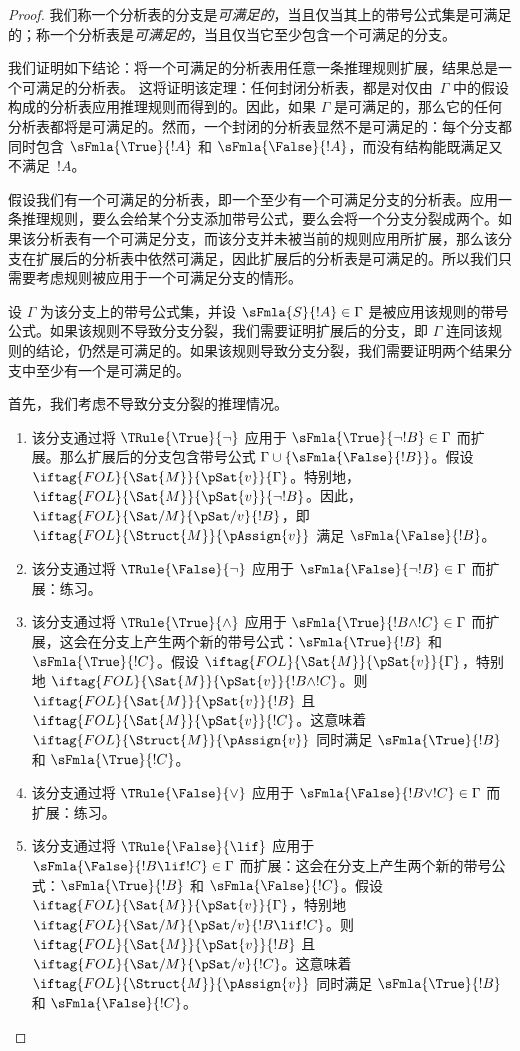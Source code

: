 \documentclass[../../../include/open-logic-section]{subfiles}
\begin{document}
\begin{proof}
我们称一个分析表的分支是\emph{可满足的}，当且仅当其上的带号公式集是可满足的；称一个分析表是\emph{可满足的}，当且仅当它至少包含一个可满足的分支。

我们证明如下结论：将一个可满足的分析表用任意一条推理规则扩展，结果总是一个可满足的分析表。
这将证明该定理：任何封闭分析表，都是对仅由~$\Gamma$ 中的假设构成的分析表应用推理规则而得到的。因此，如果 $\Gamma$ 是可满足的，那么它的任何分析表都将是可满足的。然而，一个封闭的分析表显然不是可满足的：每个分支都同时包含 $\sFmla{\True}{!A}$ 和 $\sFmla{\False}{!A}$，而没有结构能既满足又不满足~$!A$。

假设我们有一个可满足的分析表，即一个至少有一个可满足分支的分析表。应用一条推理规则，要么会给某个分支添加带号公式，要么会将一个分支分裂成两个。如果该分析表有一个可满足分支，而该分支并未被当前的规则应用所扩展，那么该分支在扩展后的分析表中依然可满足，因此扩展后的分析表是可满足的。所以我们只需要考虑规则被应用于一个可满足分支的情形。

设 $\Gamma$ 为该分支上的带号公式集，并设 $\sFmla{S}{!A} \in \Gamma$ 是被应用该规则的带号公式。如果该规则不导致分支分裂，我们需要证明扩展后的分支，即 $\Gamma$ 连同该规则的结论，仍然是可满足的。如果该规则导致分支分裂，我们需要证明两个结果分支中至少有一个是可满足的。

首先，我们考虑不导致分支分裂的推理情况。
\begin{enumerate}
\item 该分支通过将 $\TRule{\True}{\lnot}$ 应用于 $\sFmla{\True}{\lnot !B} \in \Gamma$ 而扩展。那么扩展后的分支包含带号公式 $\Gamma \cup
  \{\sFmla{\False}{!B}\}$。假设 $\iftag{FOL}{\Sat{M}}{\pSat{v}}{\Gamma}$。特别地，$\iftag{FOL}{\Sat{M}}{\pSat{v}}{\lnot !B}$。因此，$\iftag{FOL}{\Sat/{M}}{\pSat/{v}}{!B}$，即 $\iftag{FOL}{\Struct{M}}{\pAssign{v}}$ 满足 $\sFmla{\False}{!B}$。
\item 该分支通过将 $\TRule{\False}{\lnot}$ 应用于 $\sFmla{\False}{\lnot !B} \in \Gamma$ 而扩展：练习。
\item 该分支通过将 $\TRule{\True}{\land}$ 应用于 $\sFmla{\True}{!B \land !C} \in \Gamma$ 而扩展，这会在分支上产生两个新的带号公式：$\sFmla{\True}{!B}$ 和 $\sFmla{\True}{!C}$。假设 $\iftag{FOL}{\Sat{M}}{\pSat{v}}{\Gamma}$，特别地 $\iftag{FOL}{\Sat{M}}{\pSat{v}}{!B \land !C}$。则 $\iftag{FOL}{\Sat{M}}{\pSat{v}}{!B}$ 且 $\iftag{FOL}{\Sat{M}}{\pSat{v}}{!C}$。这意味着 $\iftag{FOL}{\Struct{M}}{\pAssign{v}}$ 同时满足 $\sFmla{\True}{!B}$ 和 $\sFmla{\True}{!C}$。
\item 该分支通过将 $\TRule{\False}{\lor}$ 应用于 $\sFmla{\False}{!B \lor !C} \in \Gamma$ 而扩展：练习。
\item 该分支通过将 $\TRule{\False}{\lif}$ 应用于 $\sFmla{\False}{!B \lif !C} \in \Gamma$ 而扩展：这会在分支上产生两个新的带号公式：$\sFmla{\True}{!B}$ 和 $\sFmla{\False}{!C}$。假设 $\iftag{FOL}{\Sat{M}}{\pSat{v}}{\Gamma}$，特别地 $\iftag{FOL}{\Sat/{M}}{\pSat/{v}}{!B \lif !C}$。则 $\iftag{FOL}{\Sat{M}}{\pSat{v}}{!B}$ 且 $\iftag{FOL}{\Sat/{M}}{\pSat/{v}}{!C}$。这意味着 $\iftag{FOL}{\Struct{M}}{\pAssign{v}}$ 同时满足 $\sFmla{\True}{!B}$ 和 $\sFmla{\False}{!C}$。


\end{enumerate}
\end{proof}
\end{document}
